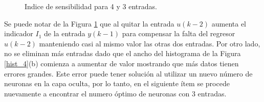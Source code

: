 \documentclass[12pt]{article}
\begin{document}
\begin{itemize}
	\begin{figure}[h!]
		\centering
		\captionsetup{justification=centering}
		\caption{Indice de sensibilidad para 4 y 3 entradas.}
		\label{Ind_4}
	\end{figure}
	Se puede notar de la Figura \ref{Ind_4} que al quitar la entrada $u(k-2)$ aumenta el indicador $I_1$ de la entrada $y(k-1)$ para compensar la falta del regresor $u(k-2)$ manteniendo casi al mismo valor las otras dos entradas. Por otro lado, no se eliminan más entradas dado que el ancho del histograma de la Figura \ref{hist_4}(b) comienza a aumentar de valor mostrando que más datos tienen errores grandes. Este error puede tener solución al utilizar un nuevo número de neuronas en la capa oculta, por lo tanto, en el siguiente ítem se procede nuevamente a encontrar el numero óptimo de neuronas con 3 entradas.
	\begin{figure}
		\centering
		\captionsetup{justification=centering}

\end{figure}
\end{itemize}
\end{document}
